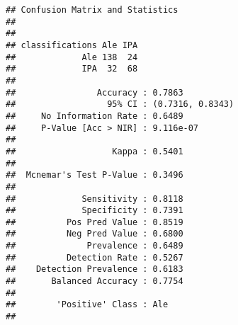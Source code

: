 \documentclass[
]{article}
\newenvironment{Shaded}{\begin{snugshade}}{\end{snugshade}}
\newcommand{\DataTypeTok}[1]{\textcolor[rgb]{0.13,0.29,0.53}{#1}}
\newcommand{\KeywordTok}[1]{\textcolor[rgb]{0.13,0.29,0.53}{\textbf{#1}}}
\newcommand{\NormalTok}[1]{#1}
\newcommand{\OperatorTok}[1]{\textcolor[rgb]{0.81,0.36,0.00}{\textbf{#1}}}
\newcommand{\OtherTok}[1]{\textcolor[rgb]{0.56,0.35,0.01}{#1}}
\newcommand{\StringTok}[1]{\textcolor[rgb]{0.31,0.60,0.02}{#1}}
\begin{document}
\begin{Shaded}
\end{Shaded}

\begin{verbatim}
## Confusion Matrix and Statistics
## 
##                
## classifications Ale IPA
##             Ale 138  24
##             IPA  32  68
##                                           
##                Accuracy : 0.7863          
##                  95% CI : (0.7316, 0.8343)
##     No Information Rate : 0.6489          
##     P-Value [Acc > NIR] : 9.116e-07       
##                                           
##                   Kappa : 0.5401          
##                                           
##  Mcnemar's Test P-Value : 0.3496          
##                                           
##             Sensitivity : 0.8118          
##             Specificity : 0.7391          
##          Pos Pred Value : 0.8519          
##          Neg Pred Value : 0.6800          
##              Prevalence : 0.6489          
##          Detection Rate : 0.5267          
##    Detection Prevalence : 0.6183          
##       Balanced Accuracy : 0.7754          
##                                           
##        'Positive' Class : Ale             
## 
\end{verbatim}

\begin{Shaded}
\end{Shaded}
\end{document}
